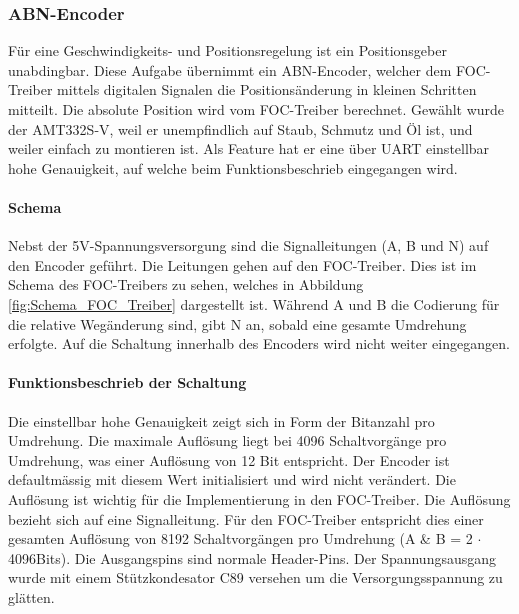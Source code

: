 \subsubsection{ABN-Encoder}
\label{subsubsec:ABN-Encoder}

Für eine Geschwindigkeits- und Positionsregelung ist ein Positionsgeber unabdingbar. Diese Aufgabe übernimmt ein ABN-Encoder, welcher dem FOC-Treiber mittels digitalen Signalen die Positionsänderung in kleinen Schritten mitteilt. Die absolute Position wird vom FOC-Treiber berechnet. Gewählt wurde der AMT332S-V, weil er unempfindlich auf Staub, Schmutz und Öl ist, und weiler einfach zu montieren ist. Als Feature hat er eine über UART einstellbar hohe Genauigkeit, auf welche beim Funktionsbeschrieb eingegangen wird.

\paragraph{Schema}\mbox{}

Nebst der 5V-Spannungsversorgung sind die Signalleitungen (A, B und N) auf den Encoder geführt. Die Leitungen gehen auf den FOC-Treiber. Dies ist im Schema des FOC-Treibers zu sehen, welches in Abbildung \ref{fig:Schema_FOC_Treiber} dargestellt ist. Während A und B die Codierung für die relative Wegänderung sind, gibt N an, sobald eine gesamte Umdrehung erfolgte. Auf die Schaltung innerhalb des Encoders wird nicht weiter eingegangen.

\paragraph{Funktionsbeschrieb der Schaltung}\mbox{}

Die einstellbar hohe Genauigkeit zeigt sich in Form der Bitanzahl pro Umdrehung. Die maximale Auflösung liegt bei 4096 Schaltvorgänge pro Umdrehung, was einer Auflösung von 12 Bit entspricht. Der Encoder ist defaultmässig mit diesem Wert initialisiert und wird nicht verändert. Die Auflösung ist wichtig für die Implementierung in den FOC-Treiber. Die Auflösung bezieht sich auf eine Signalleitung. Für den FOC-Treiber entspricht dies einer gesamten Auflösung von 8192 Schaltvorgängen pro Umdrehung (A \& B = 2 $\cdot$ 4096Bits). Die Ausgangspins sind normale Header-Pins. Der Spannungsausgang wurde mit einem Stützkondesator C89 versehen um die Versorgungsspannung zu glätten. \cite[S.1]{cui_devices_cui_2019}

